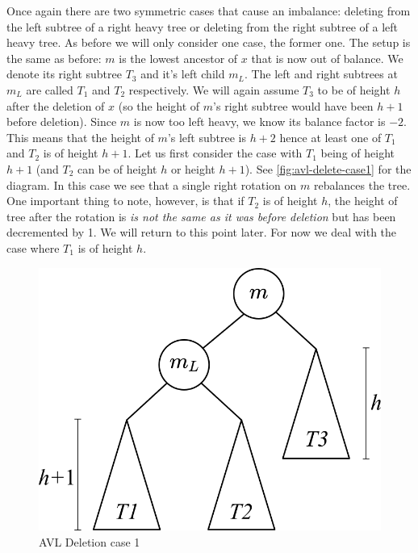Once again there are two symmetric cases that cause an imbalance: deleting from the left subtree of a right heavy tree or deleting from the right subtree of a left heavy tree. As before we will only consider one case, the former one. The setup is the same as before: $m$ is the lowest ancestor of $x$ that is now out of balance. We denote its right subtree $T_3$ and it's left child $m_L$. The left and right subtrees at $m_L$ are called $T_1$ and $T_2$ respectively. We will again assume $T_3$ to be of height $h$ after the deletion of $x$ (so the height of $m$'s right subtree would have been $h + 1$ before deletion). Since $m$ is now too left heavy, we know its balance factor is $-2$. This means that the height of $m$'s left subtree is $h + 2$ hence at least one of $T_1$ and $T_2$ is of height $h + 1$. Let us first consider the case with $T_1$ being of height $h + 1$ (and $T_2$ can be of height $h$ or height $h + 1$). See \autoref{fig:avl-delete-case1} for the diagram. In this case we see that a single right rotation on $m$ rebalances the tree. One important thing to note, however, is that if $T_2$ is of height $h$, the height of tree after the rotation is \textit{is not the same as it was before deletion} but has been decremented by 1. We will return to this point later. For now we deal with the case where $T_1$ is of height $h$.

\begin{figure}[h]
    \centering
    \includegraphics[scale=0.5]{Images/avl_delete_case1.png}
    \caption{AVL Deletion case 1}
    \label{fig:avl-delete-case1}
\end{figure}

